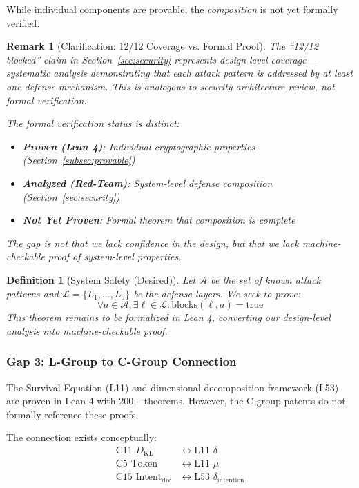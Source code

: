 \documentclass[11pt,a4paper]{article}
\newtheorem{definition}{Definition}
\newtheorem{remark}{Remark}
\newcommand{\DKL}{D_{\text{KL}}}
\begin{document}
While individual components are provable, the \emph{composition} is not yet formally verified.

\begin{remark}[Clarification: 12/12 Coverage vs. Formal Proof]
The ``12/12 blocked'' claim in Section~\ref{sec:security} represents \emph{design-level coverage}---systematic analysis demonstrating that each attack pattern is addressed by at least one defense mechanism.
This is analogous to security architecture review, not formal verification.

The formal verification status is distinct:
\begin{itemize}
    \item \textbf{Proven (Lean 4)}: Individual cryptographic properties (Section~\ref{subsec:provable})
    \item \textbf{Analyzed (Red-Team)}: System-level defense composition (Section~\ref{sec:security})
    \item \textbf{Not Yet Proven}: Formal theorem that composition is complete
\end{itemize}

The gap is not that we lack confidence in the design, but that we lack \emph{machine-checkable proof} of system-level properties.
\end{remark}

\begin{definition}[System Safety (Desired)]
Let $\mathcal{A}$ be the set of known attack patterns and $\mathcal{L} = \{L_1, \ldots, L_5\}$ be the defense layers.
We seek to prove:
\[
\forall a \in \mathcal{A}, \exists \ell \in \mathcal{L}: \text{blocks}(\ell, a) = \text{true}
\]
This theorem remains to be formalized in Lean 4, converting our design-level analysis into machine-checkable proof.
\end{definition}

\subsubsection{Gap 3: L-Group to C-Group Connection}

The Survival Equation (L11) and dimensional decomposition framework (L53) are proven in Lean 4 with 200+ theorems.
However, the C-group patents do not formally reference these proofs.

The connection exists conceptually:
\begin{align}
\text{C11 } \DKL &\leftrightarrow \text{L11 } \delta \\
\text{C5 Token} &\leftrightarrow \text{L11 } \mu \\
\text{C15 Intent}_{\text{div}} &\leftrightarrow \text{L53 } \delta_{\text{intention}}
\end{align}
\end{document}
